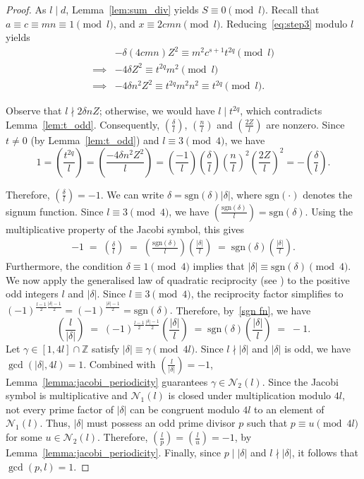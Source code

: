 \documentclass[11pt,a4paper]{amsart}
\newcommand{\ZZ}{\mathbb{Z}}
\theoremstyle{plain}
\theoremstyle{definition}
\begin{document}
\begin{proof}
As $l\mid d$, Lemma~\ref{lem:sum_div} yields $S \equiv 0 \pmod l$. Recall that $a \equiv c \equiv mn \equiv 1 \pmod l$, and $x \equiv 2cmn \pmod l$. Reducing~\eqref{eq:step3} modulo $l$ yields 
\begin{align}
    & -\delta(4cmn)Z^2 \equiv m^2c^{s+1} t^{2q} \pmod l \\
    \implies & -4\delta Z^2 \equiv t^{2q}m^2 \pmod l\\
    \implies & -4\delta n^2Z^2 \equiv t^{2q}m^2n^2\equiv t^{2q} \pmod l.
\end{align}

Observe that $l \nmid 2\delta n Z$; otherwise, we would have $l \mid t^{2q}$, which contradicts Lemma~\ref{lem:t_odd}. Consequently, $\left( \frac{\delta}{l} \right)$, $\left( \frac{n}{l} \right)$ and $\left( \frac{2Z}{l} \right)$ are nonzero. Since $t\neq 0 $ (by Lemma~\ref{lem:t_odd}) and $l \equiv 3 \pmod 4$, we have
\[1 = \left(\frac{t^{2q}}{l}\right) = \left( \frac{-4\delta n^2Z^2}{l} \right) = \left( \frac{-1}{l} \right) \left( \frac{\delta}{l} \right) \left( \frac{n}{l} \right)^2 \left( \frac{2Z}{l} \right)^2 = - \left( \frac{\delta}{l} \right).\]

Therefore, $\left(\frac{\delta}{l}\right) = -1$. We can write $\delta = \text{sgn}(\delta)|\delta|$, where $\text{sgn}(\cdot)$ denotes the signum function. Since $l \equiv 3 \pmod 4$, we have $\left(\frac{\text{sgn}(\delta)}{l}\right) = \text{sgn}(\delta)$. Using the multiplicative property of the Jacobi symbol, this gives
\begin{align}\label{sgn fn}
  -1 \;=\; \left(\frac{\delta}{l}\right) \;=\; \left(\frac{\text{sgn}(\delta)}{l}\right)\left(\frac{|\delta|}{l}\right) \;=\; \text{sgn}(\delta)\left(\frac{|\delta|}{l}\right).
\end{align}
Furthermore, the condition $\delta \equiv 1 \pmod 4$ implies that $|\delta| \equiv \text{sgn}(\delta) \pmod 4$. We now apply the generalised law of quadratic reciprocity (see \cite[p.~192]{Burton}) to the positive odd integers $l$ and $|\delta|$. Since $l \equiv 3 \pmod 4$, the reciprocity factor simplifies to $(-1)^{\frac{l-1}{2} \frac{|\delta|-1}{2}} = (-1)^{\frac{|\delta|-1}{2}} = \text{sgn}(\delta).$ 
Therefore, by~\eqref{sgn fn}, we have
\[
  \left(\frac{l}{|\delta|}\right) \;=\; (-1)^{\frac{l-1}{2} \frac{|\delta|-1}{2}} \left(\frac{|\delta|}{l}\right)
  \;=\;  \text{sgn}(\delta)\left(\frac{|\delta|}{l}\right) \;=\; -1.
\]
Let $\gamma \in [1,4l]\cap\ZZ$ satisfy $|\delta| \equiv \gamma \pmod{4l}$. Since $l \nmid |\delta|$ and $|\delta|$ is odd, we have $\gcd(|\delta|, 4l) = 1$. Combined with $\left(\frac{l}{|\delta|}\right) = -1$, Lemma~\ref{lemma:jacobi_periodicity} guarantees $\gamma \in \mathcal{N}_2(l)$. Since the Jacobi symbol is multiplicative and $\mathcal{N}_1(l)$ is
closed under multiplication modulo $4l$, not every prime factor of
$|\delta|$ can be congruent modulo $4l$ to an element of
$\mathcal{N}_1(l)$. Thus, $|\delta|$ must possess an odd prime divisor $p$ such that $p \equiv u \pmod{4l}$ for some $u \in \mathcal{N}_2(l)$. Therefore, $\left(\frac{l}{p}\right) = \left(\frac{l}{u}\right) = -1$, by Lemma~\ref{lemma:jacobi_periodicity}. Finally, since $p \mid |\delta|$ and $l \nmid |\delta|$, it follows that $\gcd(p, l) = 1$.


\end{proof}
\end{document}
